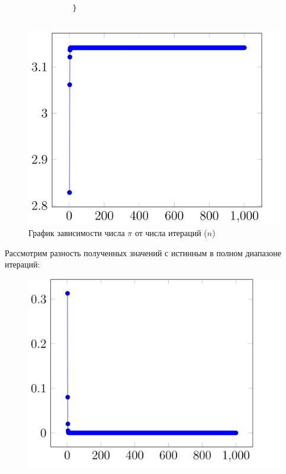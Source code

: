 \documentclass[a4paper, 12pt]{article}
\begin{document}
\begin{enumerate}
\begin{enumerate}
\begin{lstlisting}
                }
                        \end{lstlisting}
                        \[\]
                        \begin{figure}[h!]
    			        \centering
    			            \includegraphics[scale = 0.23]{3-1.png}
    			            \caption{График зависимости числа $\pi$ от числа итераций ($n$)}
    			            \label{fig:my_label}
    		          \end{figure}
                        \newpage
                        Рассмотрим разность полученных значений с истинным в полном диапазоне итераций:
                        \begin{figure}[h!]
    			        \centering
    			            \includegraphics[scale = 0.25]{3-2.png}

\end{figure}
\end{enumerate}
\end{enumerate}
\end{document}
